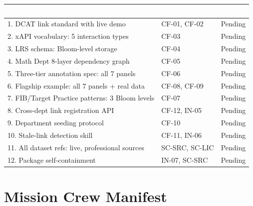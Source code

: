 \documentclass[11pt,letterpaper]{article}
\newcommand{\tableheader}[1]{\textbf{\sffamily\textcolor{white}{#1}}}
\begin{document}
\begin{center}
\begin{tabularx}{\textwidth}{XL{3.5cm}C{1.5cm}}
\toprule
{}
\tableheader{Success Criterion} & \tableheader{Test ID(s)} & \tableheader{Status} \\
. DCAT link standard with live demo & CF-01, CF-02 & Pending \\
2. xAPI vocabulary: 5 interaction types & CF-03 & Pending \\
3. LRS schema: Bloom-level storage & CF-04 & Pending \\
4. Math Dept 8-layer dependency graph & CF-05 & Pending \\
5. Three-tier annotation spec: all 7 panels & CF-06 & Pending \\
6. Flagship example: all 7 panels + real data & CF-08, CF-09 & Pending \\
7. FIB/Target Practice patterns: 3 Bloom levels & CF-07 & Pending \\
8. Cross-dept link registration API & CF-12, IN-05 & Pending \\
9. Department seeding protocol & CF-10 & Pending \\
10. Stale-link detection skill & CF-11, IN-06 & Pending \\
11. All dataset refs: live, professional sources & SC-SRC, SC-LIC & Pending \\
12. Package self-containment & IN-07, SC-SRC & Pending \\
\bottomrule
\end{tabularx}
\end{center}

\section{Mission Crew Manifest}
\end{document}
